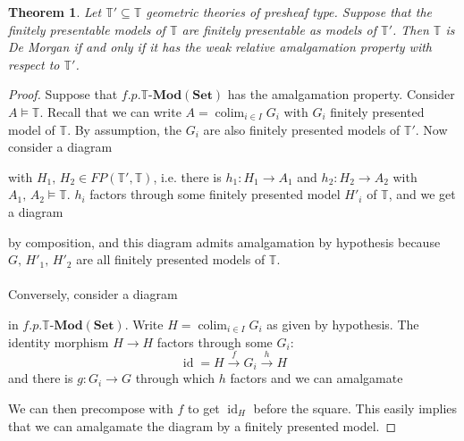 \documentclass{article}
\newtheorem{theorem}{Theorem}
\newcommand{\T}{\mathbb{T}}
\newcommand{\colim}{\operatorname{colim}}
\newcommand{\id}{\operatorname{id}}
\newcommand{\Set}{\mathbf{Set}}
\newcommand{\Mod}{{\mathbf{Mod}}}
\begin{document}
\begin{theorem}
    Let $\T'\subseteq\T$ geometric theories of presheaf type. Suppose that the finitely presentable models of $\T$ are finitely presentable as models of $\T'$. Then $\T$ is De Morgan if and only if it has the weak relative amalgamation property with respect to $\T'$.
\end{theorem}
\begin{proof}
    Suppose that $f.p.\T$-$\Mod(\Set)$ has the amalgamation property. Consider $A\models\T$. Recall that we can write $A=\colim_{i\in I}G_i$ with $G_i$ finitely presented model of $\T$. By assumption, the $G_i$ are also finitely presented models of $\T'$. Now consider a diagram  
    \begin{center}
    \end{center}
    with $H_1,\, H_2\in FP(\T',\T)$, i.e. there is $h_1:H_1\xrightarrow{}A_1$ and $h_2:H_2\xrightarrow{}A_2$ with $A_1,\,A_2\models\T$. $h_i$ factors through some finitely presented model $H'_i$ of $\T$, and we get a diagram 
     \begin{center}
    \end{center}
    by composition, and this diagram admits amalgamation by hypothesis because $G,\,H'_1,\,H'_2$ are all finitely presented models of $\T$.\\
    \\
    Conversely, consider a diagram 
     \begin{center}
    \end{center}
    in $f.p.\T$-$\Mod(\Set)$. Write $H=\colim_{i\in I}G_i$ as given by hypothesis. The identity morphism $H\xrightarrow{}H$ factors through some $G_i$:
    $$\id=H\xrightarrow{f}G_i\xrightarrow{h}H$$
    and there is $g:G_i\xrightarrow{}G$ through which $h$ factors and we can amalgamate
    \begin{center}
    \end{center}
    We can then precompose with $f$ to get $\id_H$ before the square. This easily implies that we can amalgamate the diagram by a finitely presented model.
\end{proof}
\end{document}
